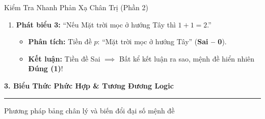 \documentclass[aspectratio=169, 10pt]{beamer}
\begin{document}
\begin{frame}{Kiểm Tra Nhanh Phản Xạ Chân Trị (Phần 2)}
\begin{cozyExample}
\begin{enumerate}
      \item \textbf{Phát biểu 3:} ``Nếu Mặt trời mọc ở hướng Tây thì $1 + 1 = 2$.''
      \begin{itemize}
        \setlength{\itemsep}{1pt}
        \item \textbf{Phân tích:} Tiền đề $p$: ``Mặt trời mọc ở hướng Tây'' (\textbf{\textcolor{cozyFalse}{Sai -- 0}}).
        \item \textbf{Kết luận:} Tiền đề Sai $\implies$ Bất kể kết luận ra sao, mệnh đề hiển nhiên \textbf{\textcolor{cozyTrue}{Đúng (1)}}!
      \end{itemize}
    \end{enumerate}
  \end{cozyExample}
\end{frame}


\begin{frame}[plain]
  \centering
  \vspace*{2.0cm}
  {\LARGE\textbf{\color{cozySlate}3. Biểu Thức Phức Hợp \& Tương Đương Logic}}
  \par\vspace{0.4cm}
  {\color{cozyWarm}\rule{0.6\textwidth}{1.5pt}}
  \par\vspace{0.3cm}
  {\normalsize\color{cozyMuted}Phương pháp bảng chân lý và biến đổi đại số mệnh đề}
\end{frame}
\end{document}
